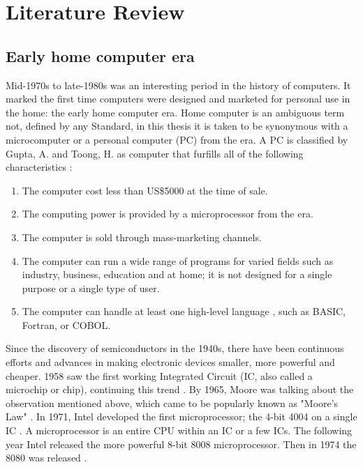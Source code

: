 

\chapter{Literature Review} %
\label{Chapter2} %

\section{Early home computer era} \label{sec: Early home computer era}
 
Mid-1970s to late-1980s was an interesting period in the history of computers. It marked the first time computers were designed and marketed for personal use in the home: the early home computer era. Home computer is an ambiguous term not, defined by any Standard, in this thesis it is taken to be synonymous with a microcomputer or a personal computer (PC) from the era. A PC is classified by Gupta, A. and Toong, H. as computer that furfills all of the following characteristics 
\cite{Gupta84}: 

\begin{enumerate}
\item The computer cost less than US\$5000 at the time of sale.\\
\item The computing power is provided by a microprocessor from the era. \\
\item The computer is sold through mass-marketing channels. \\
\item The computer can run a wide range of programs for varied fields such as industry, business, education and at home; it is not designed for a single purpose or a single type of user.
\item The computer can handle at least one high-level language , such as BASIC, Fortran, or COBOL.
\end{enumerate}

Since the discovery of semiconductors in the 1940s, there have been continuous efforts and advances in making electronic devices smaller, more powerful and cheaper. 1958 saw the first working Integrated Circuit (IC, also called a microchip or chip), continuing this trend 
\cite{Kilby01}. By 1965, Moore was talking about the observation mentioned above, which came to be popularly known as "Moore's Law" 
\cite{moore65}. In 1971, Intel developed the first microprocessor; the 4-bit 4004 on a single IC 
\cite{intel4004}. A microprocessor is an entire CPU within an IC or a few ICs. The following year Intel released the more powerful 8-bit 8008 microprocessor. Then in 1974 the 8080 was released 
\cite{intelchips}.

